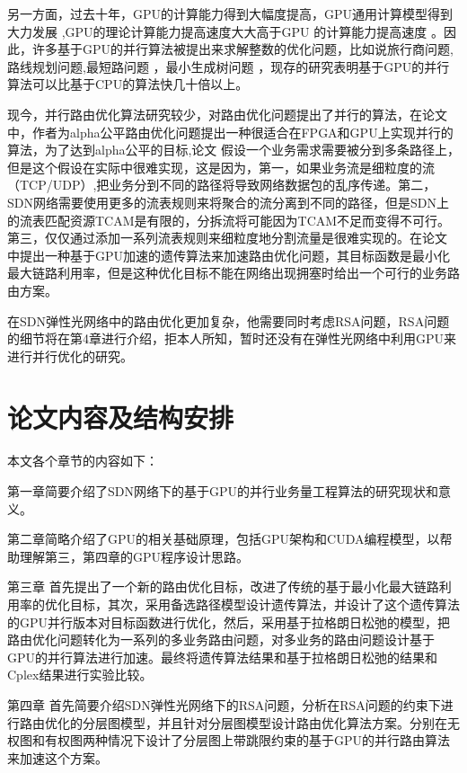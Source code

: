 \documentclass[master]{thesis-uestc}
\begin{document}
另一方面，过去十年，GPU的计算能力得到大幅度提高，GPU通用计算模型得到大力发展 ,GPU的理论计算能力提高速度大大高于GPU 的计算能力提高速度 。因此，许多基于GPU的并行算法被提出来求解整数的优化问题，比如说旅行商问题,路线规划问题,最短路问题 ，最小生成树问题 ，现存的研究表明基于GPU的并行算法可以比基于CPU的算法快几十倍以上。

现今，并行路由优化算法研究较少，对路由优化问题提出了并行的算法，在论文中，作者为alpha公平路由优化问题提出一种很适合在FPGA和GPU上实现并行的算法，为了达到alpha公平的目标,论文 假设一个业务需求需要被分到多条路径上，但是这个假设在实际中很难实现，这是因为，第一，如果业务流是细粒度的流（TCP/UDP）,把业务分到不同的路径将导致网络数据包的乱序传递。第二，SDN网络需要使用更多的流表规则来将聚合的流分离到不同的路径，但是SDN上的流表匹配资源TCAM是有限的，分拆流将可能因为TCAM不足而变得不可行。第三，仅仅通过添加一系列流表规则来细粒度地分割流量是很难实现的。在论文 中提出一种基于GPU加速的遗传算法来加速路由优化问题，其目标函数是最小化最大链路利用率，但是这种优化目标不能在网络出现拥塞时给出一个可行的业务路由方案。

在SDN弹性光网络中的路由优化更加复杂，他需要同时考虑RSA问题，RSA问题的细节将在第4章进行介绍，拒本人所知，暂时还没有在弹性光网络中利用GPU来进行并行优化的研究。
\section{论文内容及结构安排}
本文各个章节的内容如下：

第一章简要介绍了SDN网络下的基于GPU的并行业务量工程算法的研究现状和意义。

第二章简略介绍了GPU的相关基础原理，包括GPU架构和CUDA编程模型，以帮助理解第三，第四章的GPU程序设计思路。

第三章 首先提出了一个新的路由优化目标，改进了传统的基于最小化最大链路利用率的优化目标，其次，采用备选路径模型设计遗传算法，并设计了这个遗传算法的GPU并行版本对目标函数进行优化，然后，采用基于拉格朗日松弛的模型，把路由优化问题转化为一系列的多业务路由问题，对多业务的路由问题设计基于GPU的并行算法进行加速。最终将遗传算法结果和基于拉格朗日松弛的结果和Cplex结果进行实验比较。

第四章 首先简要介绍SDN弹性光网络下的RSA问题，分析在RSA问题的约束下进行路由优化的分层图模型，并且针对分层图模型设计路由优化算法方案。分别在无权图和有权图两种情况下设计了分层图上带跳限约束的基于GPU的并行路由算法来加速这个方案。



\end{document}
